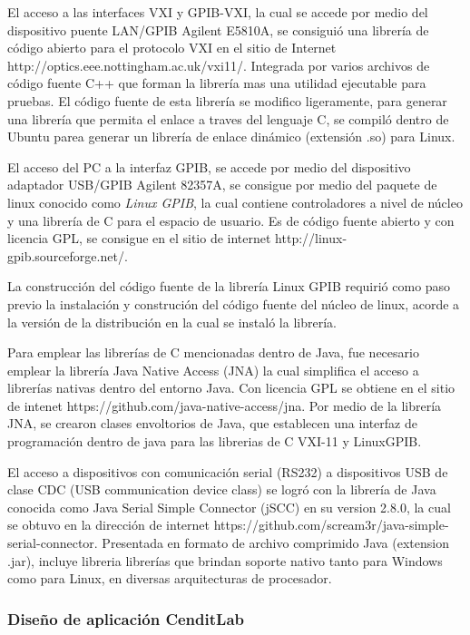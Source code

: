 \documentclass[paper=letter,oneside,fontsize=12pt, parskip=full]{article}
\begin{document}
	El acceso a las interfaces VXI y GPIB-VXI, la cual se accede por medio del dispositivo puente LAN/GPIB Agilent E5810A, se consiguió una librería de código abierto para el protocolo VXI en el sitio de Internet http://optics.eee.nottingham.ac.uk/vxi11/. Integrada por varios archivos de código fuente C++ que forman la librería mas una utilidad ejecutable para pruebas. El código fuente de esta librería se modifico ligeramente, para generar una librería que permita el enlace a traves del lenguaje C, se compiló dentro de Ubuntu parea generar un librería de  enlace dinámico  (extensión .so)  para Linux.
	
	El acceso del PC a la interfaz GPIB, se accede por medio del dispositivo adaptador USB/GPIB Agilent 82357A, se consigue por medio del paquete de linux conocido como \emph{Linux GPIB}, la cual contiene controladores a nivel de núcleo y una librería de C para el espacio de usuario.  Es de código fuente abierto y con licencia GPL, se consigue en el sitio de internet http://linux-gpib.sourceforge.net/. 
	
	La construcción del código fuente de la librería Linux GPIB requirió como paso previo la instalación y construción del código fuente del núcleo de linux, acorde a la versión de la distribución en la cual se instaló la librería.
	
	Para emplear las librerías de C mencionadas dentro de Java, fue necesario emplear la librería Java Native Access (JNA) la cual simplifica el acceso a librerías nativas dentro del entorno Java. Con licencia GPL se obtiene en el sitio de intenet https://github.com/java-native-access/jna.  Por medio de la librería JNA, se crearon clases envoltorios de Java, que establecen una interfaz de programación dentro de java para las librerias de C VXI-11 y LinuxGPIB.
	
	El acceso a dispositivos con comunicación serial (RS232) a dispositivos USB de clase CDC (USB communication device class) se logró con la librería de Java conocida como
	Java Serial Simple Connector (jSCC) en su version 2.8.0, la cual se obtuvo en la dirección de internet https://github.com/scream3r/java-simple-serial-connector. Presentada en formato de archivo comprimido Java (extension .jar), incluye libreria  librerías que brindan soporte nativo tanto para Windows como para Linux, en diversas arquitecturas de procesador.
	
	\subsubsection{Diseño de aplicación CenditLab}
	
\end{document}
